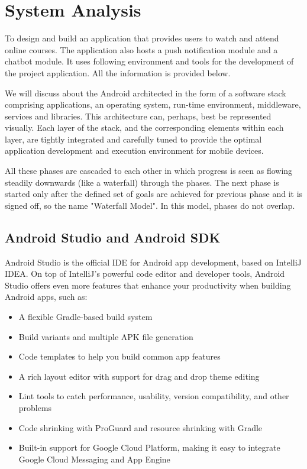 \section{System Analysis}
To design and build an application that provides users to watch and attend online courses. The application also hosts a push notification module and a chatbot module.  It uses following environment and tools for the development of the project application. All the information is provided below.

We will discuss about the Android architected in the form of a software stack comprising applications, an operating system, run-time environment, middleware, services and libraries. This architecture can, perhaps, best be represented visually. Each layer of the stack, and the corresponding elements within each layer, are tightly integrated and carefully tuned to provide the optimal application development and execution environment for mobile devices.

All these phases are cascaded to each other in which progress is seen as flowing steadily downwards (like a waterfall) through the phases. The next phase is started only after the defined set of goals are achieved for previous phase and it is signed off, so the name "Waterfall Model". In this model, phases do not overlap.




\subsection{Android Studio and Android SDK }

Android Studio is the official IDE for Android app development, based on IntelliJ IDEA. On top of IntelliJ's powerful code editor and developer tools, Android Studio offers even more features that enhance your productivity when building Android apps, such as:
\begin{itemize}

\item{A flexible Gradle-based build system}

	\item{Build variants and multiple APK file generation}

	\item{Code templates to help you build common app features}

\item{A rich layout editor with support for drag and drop theme editing}

\item{ Lint tools to catch performance, usability, version compatibility, and other problems}

\item{Code shrinking with ProGuard and resource shrinking with Gradle}

\item{Built-in support for Google Cloud Platform, making it easy to integrate Google Cloud Messaging and App Engine}
\end{itemize}


